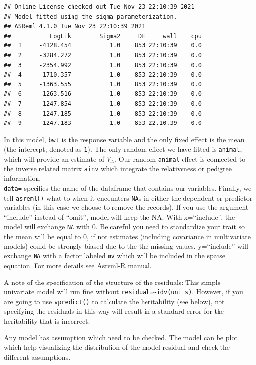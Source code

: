 \documentclass[
  12pt,
]{book}
\begin{document}
\begin{verbatim}
## Online License checked out Tue Nov 23 22:10:39 2021
## Model fitted using the sigma parameterization.
## ASReml 4.1.0 Tue Nov 23 22:10:39 2021
##           LogLik        Sigma2     DF     wall    cpu
##  1     -4128.454           1.0    853 22:10:39    0.0
##  2     -3284.272           1.0    853 22:10:39    0.0
##  3     -2354.992           1.0    853 22:10:39    0.0
##  4     -1710.357           1.0    853 22:10:39    0.0
##  5     -1363.555           1.0    853 22:10:39    0.0
##  6     -1263.516           1.0    853 22:10:39    0.0
##  7     -1247.854           1.0    853 22:10:39    0.0
##  8     -1247.185           1.0    853 22:10:39    0.0
##  9     -1247.183           1.0    853 22:10:39    0.0
\end{verbatim}

In this model, \texttt{bwt} is the response variable and the only fixed effect is the mean (the intercept, denoted as \texttt{1}). The only random effect we have fitted is \texttt{animal}, which will provide an estimate of \(V_A\). Our random \texttt{animal} effect is connected to the inverse related matrix \texttt{ainv} which integrate the relativeness or pedigree information.\\
\texttt{data=} specifies the name of the dataframe that contains our variables. Finally, we tell \texttt{asreml()} what to when it encounters \texttt{NA}s in either the dependent or predictor variables (in this case we choose to remove the records). If you use the argument ``include'' instead of ``omit'', model will keep the NA. With x=``include'', the model will exchange \texttt{NA} with 0. Be careful you need to standardize your trait so the mean will be equal to 0, if not estimates (including covariance in multivariate models) could be strongly biased due to the the missing values. y=``include'' will exchange \texttt{NA} with a factor labeled \texttt{mv} which will be included in the sparse equation. For more details see Asreml-R manual.

A note of the specification of the structure of the residuals: This simple univariate model will run fine without \texttt{residual=\textasciitilde{}idv(units)}. However, if you are going to use \texttt{vpredict()} to calculate the heritability (see below), not specifying the residuals in this way will result in a standard error for the heritability that is incorrect.

Any model has assumption which need to be checked. The model can be plot which help visualizing the distribution of the model residual and check the different assumptions.
\end{document}
